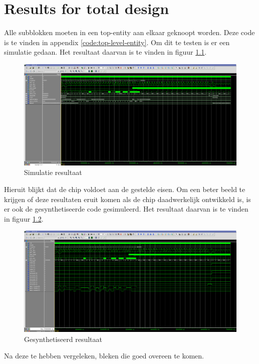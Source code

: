 \chapter{Results for total design}
Alle subblokken moeten in een top-entity aan elkaar geknoopt worden. Deze code is te vinden in appendix \ref{code:top-level-entity}. Om dit te testen is er een simulatie gedaan. Het resultaat daarvan is te vinden in figuur \ref{fig:uiteinres}.

\begin{figure}[h!]
\includegraphics[width=\textwidth]{behaviour}
\caption{Simulatie resultaat}
\label{fig:uiteinres}
\end{figure}

Hieruit blijkt dat de chip voldoet aan de gestelde eisen. Om een beter beeld te krijgen of deze resultaten eruit komen als de chip daadwerkelijk ontwikkeld is, is er ook de gesynthetiseerde code gesimuleerd. Het resultaat daarvan is te vinden in figuur \ref{fig:uiteinsimres}.

\begin{figure}[h!]
\includegraphics[width=\textwidth]{synthesised.png}
\caption{Gesynthetiseerd resultaat}
\label{fig:uiteinsimres}
\end{figure}

Na deze te hebben vergeleken, bleken die goed overeen te komen.